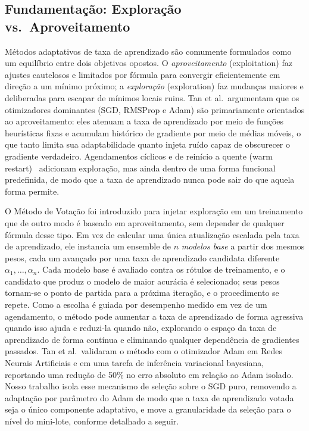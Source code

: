 \documentclass[conference]{IEEEtran}
\begin{document}
\subsection{Fundamentação: Exploração vs.\ Aproveitamento}

Métodos adaptativos de taxa de aprendizado são comumente formulados como um equilíbrio entre dois objetivos opostos. O \emph{aproveitamento} (exploitation) faz ajustes cautelosos e limitados por fórmula para convergir eficientemente em direção a um mínimo próximo; a \emph{exploração} (exploration) faz mudanças maiores e deliberadas para escapar de mínimos locais ruins. Tan et al.\ argumentam que os otimizadores dominantes (SGD, RMSProp e Adam) são primariamente orientados ao aproveitamento: eles atenuam a taxa de aprendizado por meio de funções heurísticas fixas e acumulam histórico de gradiente por meio de médias móveis, o que tanto limita sua adaptabilidade quanto injeta ruído capaz de obscurecer o gradiente verdadeiro. Agendamentos cíclicos e de reinício a quente (warm restart)~\cite{smith2017cyclical, loshchilov2017sgdr} adicionam exploração, mas ainda dentro de uma forma funcional predefinida, de modo que a taxa de aprendizado nunca pode sair do que aquela forma permite.

O Método de Votação foi introduzido para injetar exploração em um treinamento que de outro modo é baseado em aproveitamento, sem depender de qualquer fórmula desse tipo. Em vez de calcular uma única atualização escalada pela taxa de aprendizado, ele instancia um ensemble de $n$ \emph{modelos base} a partir dos mesmos pesos, cada um avançado por uma taxa de aprendizado candidata diferente $\alpha_1, \ldots, \alpha_n$. Cada modelo base é avaliado contra os rótulos de treinamento, e o candidato que produz o modelo de maior acurácia é selecionado; seus pesos tornam-se o ponto de partida para a próxima iteração, e o procedimento se repete. Como a escolha é guiada por desempenho medido em vez de um agendamento, o método pode aumentar a taxa de aprendizado de forma agressiva quando isso ajuda e reduzi-la quando não, explorando o espaço da taxa de aprendizado de forma contínua e eliminando qualquer dependência de gradientes passados. Tan et al.\ validaram o método com o otimizador Adam em Redes Neurais Artificiais e em uma tarefa de inferência variacional bayesiana, reportando uma redução de 50\% no erro absoluto em relação ao Adam isolado. Nosso trabalho isola esse mecanismo de seleção sobre o SGD puro, removendo a adaptação por parâmetro do Adam de modo que a taxa de aprendizado votada seja o único componente adaptativo, e move a granularidade da seleção para o nível do mini-lote, conforme detalhado a seguir.
\end{document}
